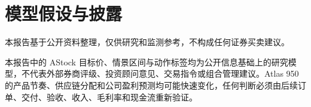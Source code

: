 \documentclass[a4paper,11pt,openany,fontset=none]{ctexrep}
\newcommand{\reportdisclaimer}{本报告基于公开资料整理，仅供研究和监测参考，不构成任何证券买卖建议。}
\begin{document}
\chapter{模型假设与披露}


\clearpage
\thispagestyle{empty}
\vspace*{4cm}
\begin{disclosurebox}[免责声明]
\small
\reportdisclaimer\par
本报告中的 AStock 目标价、情景区间与动作标签均为公开信息基础上的研究模型，不代表外部券商评级、投资顾问意见、交易指令或组合管理建议。Atlas 950 的产品节奏、供应链分配和公司盈利预测均可能快速变化，任何判断必须由后续订单、交付、验收、收入、毛利率和现金流重新验证。
\end{disclosurebox}
\end{document}
